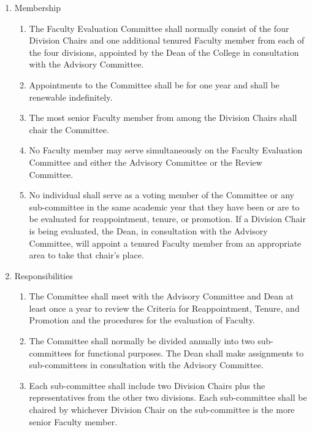 \documentclass{manual}
\newcommand{\itemLevelA}{\alph*.}
\newcommand{\itemLevelB}{\arabic*)}
\newcommand{\itemRefA}{\alph*}
\newcommand{\itemRefB}{\arabic*}
\begin{document}
\begin{enumerate}[label=\itemLevelA,ref=\itemRefA]
\item Membership
\begin{enumerate}[label=\itemLevelB,ref=\itemRefB]
\item The Faculty Evaluation Committee shall normally consist of the four Division Chairs and one additional tenured Faculty member from each of the four divisions, appointed by the Dean of the College in consultation with the Advisory Committee.
\item Appointments to the Committee shall be for one year and shall be renewable indefinitely.
\item The most senior Faculty member from among the Division Chairs shall chair the Committee.
\item No Faculty member may serve simultaneously on the Faculty Evaluation Committee and either the Advisory Committee or the Review Committee.
\item No individual shall serve as a voting member of the Committee or any sub-committee in the same academic year that they have  been or are to be evaluated for reappointment, tenure, or promotion. If a Division Chair is being evaluated, the Dean, in consultation with the Advisory Committee, will appoint a tenured Faculty member from an appropriate area to take that chair's place.
\end{enumerate}
\item Responsibilities
\begin{enumerate}[label=\itemLevelB,ref=\itemRefB]
\item The Committee shall meet with the Advisory Committee and Dean at least once a year to review the Criteria for Reappointment, Tenure, and Promotion and the procedures for the evaluation of Faculty.
\item The Committee shall normally be divided annually into two sub-committees for functional purposes. The Dean shall make assignments to sub-committees in consultation with the Advisory Committee.
\item Each sub-committee shall include two Division Chairs plus the representatives from the other two divisions. Each sub-committee shall be chaired by whichever Division Chair on the sub-committee is the more senior Faculty member.


\end{enumerate}
\end{enumerate}
\end{document}
